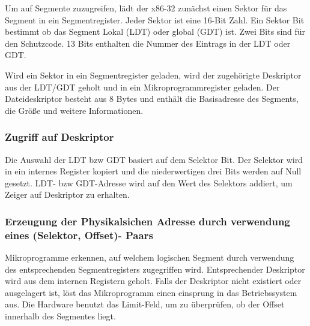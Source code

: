 Um auf Segmente zuzugreifen, lädt der x86-32 zunächst einen Sektor für das
Segment in ein Segmentregister. Jeder Sektor ist eine 16-Bit Zahl. Ein Sektor
Bit bestimmt ob das Segment Lokal (LDT) oder global (GDT) ist. Zwei Bits sind
für den Schutzcode. 13 Bits enthalten die Nummer des Eintrags in der LDT oder
GDT.

Wird ein Sektor in ein Segmentregister geladen, wird der zugehörigte Deskriptor
aus der LDT/GDT geholt und in ein Mikroprogrammregister geladen. Der
Dateideskriptor besteht aus 8 Bytes und enthält die Basisadresse des Segments,
die Größe und weitere Informationen.

\subsubsection{Zugriff auf Deskriptor}

Die Auswahl der LDT bzw GDT basiert auf dem Selektor Bit. Der Selektor wird in
ein internes Register kopiert und die niederwertigen drei Bits werden auf Null
gesetzt. LDT- bzw GDT-Adresse wird auf den Wert des Selektors addiert, um
Zeiger auf Deskriptor zu erhalten.

\subsubsection{Erzeugung der Physikalsichen Adresse durch verwendung eines (Selektor, Offset)- Paars}

Mikroprogramme erkennen, auf welchem logischen Segment durch verwendung des
entsprechenden Segmentregisters zugegriffen wird. Entsprechender Deskriptor
wird aus dem internen Registern geholt. Falls der Deskriptor nicht existiert
oder ausgelagert ist, löst das Mikroprogramm einen einsprung in das
Betriebssystem aus. Die Hardware benutzt das Limit-Feld, um zu überprüfen, ob
der Offset innerhalb des Segmentes liegt.

